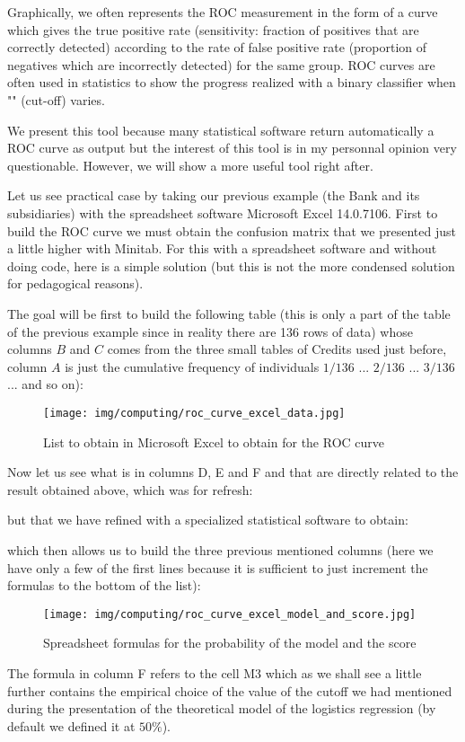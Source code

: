 	Graphically, we often represents the ROC measurement  in the form of a curve which gives the true positive rate (sensitivity: fraction of positives that are correctly detected) according to the rate of false positive rate (proportion of negatives which are incorrectly detected) for the same group. ROC curves are often used in statistics to show the progress realized with a binary classifier when "" (cut-off) varies.
	\begin{tcolorbox}[title=Remark,colframe=black,arc=10pt]
	We present this tool because many statistical software return automatically a ROC curve as output but the interest of this tool is in my personnal opinion very questionable. However, we will show a more useful tool right after.
	\end{tcolorbox}
	Let us see practical case by taking our previous example (the Bank and its subsidiaries) with the spreadsheet software Microsoft Excel 14.0.7106. First to build the ROC curve we must obtain the confusion matrix that we presented just a little higher with Minitab. For this with a spreadsheet software and without doing code, here is a simple solution (but this is not the more condensed solution for pedagogical reasons).
	
	The goal will be first to build the following table (this is only a part of the table of the previous example since in reality there are 136 rows of data) whose columns $B$ and $C$ comes from the three small tables of Credits used just before, column $A$ is just the cumulative frequency of individuals $1/136$ ... $2/136$ ... $3/136$ ... and so on):
	\begin{figure}[H]
		\centering
		\texttt{[image: img/computing/roc\_curve\_excel\_data.jpg]}
		\caption{List to obtain in Microsoft Excel to obtain for the ROC curve}
	\end{figure}
	Now let us see what is in columns D, E and F and that are directly related to the result obtained above, which was for refresh:
	
	but that we have refined with a specialized statistical software to obtain:
	
	which then allows us to build the three previous mentioned columns (here we have only a few of the first lines because it is sufficient to just increment the formulas to the bottom of the list):
	\begin{figure}[H]
		\centering
		\texttt{[image: img/computing/roc\_curve\_excel\_model\_and\_score.jpg]}
		\caption{Spreadsheet formulas for the probability of the model and the score}
	\end{figure}
	The formula in column F refers to the cell M3 which as we shall see a little further contains the empirical choice of the value of the cutoff we had mentioned during the presentation of the theoretical model of the logistics regression (by default we defined it at $50\%$).
	
